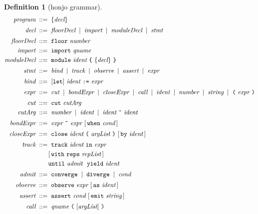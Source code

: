 \documentclass[11pt,a4paper]{article}
\theoremstyle{thmstyle}
\theoremstyle{definition}
\newtheorem{definition}[theorem]{Definition}
\theoremstyle{remark}
\newcommand{\bnf}{\;::=\;}
\newcommand{\alt}{\;\mid\;}
\newcommand{\hj}[1]{\texttt{#1}}
\begin{document}
\begin{definition}[honjo grammar]
\label{def:grammar}
\begin{align*}
\textit{program} &\bnf \{\textit{decl}\} \\[2pt]
\textit{decl} &\bnf \textit{floorDecl} \alt \textit{import}
   \alt \textit{moduleDecl} \alt \textit{stmt} \\[2pt]
\textit{floorDecl} &\bnf \hj{floor}\ \textit{number} \\
\textit{import} &\bnf \hj{import}\ \textit{qname} \\
\textit{moduleDecl} &\bnf \hj{module}\ \textit{ident}\ \hj{\{}\ \{\textit{decl}\}\ \hj{\}} \\[2pt]
\textit{stmt} &\bnf \textit{bind} \alt \textit{track} \alt \textit{observe}
   \alt \textit{assert} \alt \textit{expr} \\[2pt]
\textit{bind} &\bnf [\hj{let}]\ \textit{ident}\ \hj{:=}\ \textit{expr} \\[2pt]
\textit{expr} &\bnf \textit{cut} \alt \textit{bondExpr}
   \alt \textit{closeExpr} \alt \textit{call} \alt \textit{ident}
   \alt \textit{number} \alt \textit{string}
   \alt \hj{(}\ \textit{expr}\ \hj{)} \\[2pt]
\textit{cut} &\bnf \hj{cut}\ \textit{cutArg} \\
\textit{cutArg} &\bnf \textit{number} \alt \textit{ident}
   \alt \textit{ident}\ \hj{\~{}}\ \textit{ident} \\[2pt]
\textit{bondExpr} &\bnf \textit{expr}\ \hj{\~{}}\ \textit{expr}\
   [\,\hj{when}\ \textit{cond}\,] \\[2pt]
\textit{closeExpr} &\bnf \hj{close}\ \textit{ident}\ \hj{(}\
   \textit{argList}\ \hj{)}\ [\,\hj{by}\ \textit{ident}\,] \\[2pt]
\textit{track} &\bnf \hj{track}\ \textit{ident}\ \hj{in}\ \textit{expr} \\
   &\qquad [\,\hj{with}\ \hj{reps}\ \textit{repList}\,]\ \\
   &\qquad \hj{until}\ \textit{admit}\ \ \hj{yield}\ \textit{ident} \\[2pt]
\textit{admit} &\bnf \hj{converge} \alt \hj{diverge} \alt \textit{cond} \\[2pt]
\textit{observe} &\bnf \hj{observe}\ \textit{expr}\
   [\,\hj{as}\ \textit{ident}\,] \\[2pt]
\textit{assert} &\bnf \hj{assert}\ \textit{cond}\
   [\,\hj{emit}\ \textit{string}\,] \\[2pt]
\textit{call} &\bnf \textit{qname}\ \hj{(}\ [\textit{argList}]\ \hj{)} \\

\end{align*}
\end{definition}
\end{document}
